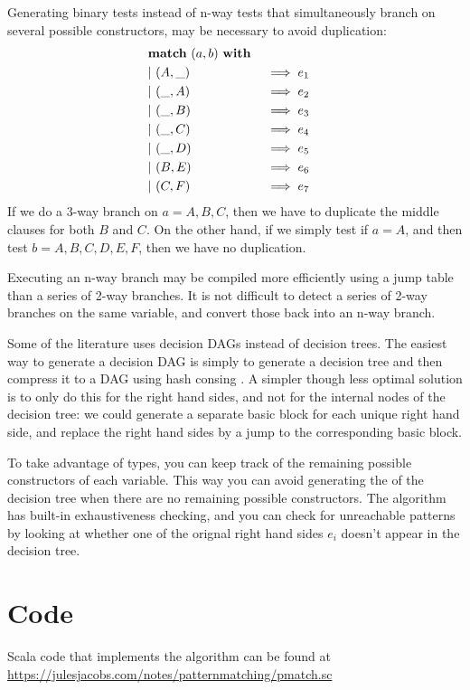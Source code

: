 \documentclass[a4paper, 11pt]{article}
\theoremstyle{definition}
\begin{document}
Generating binary tests instead of n-way tests that simultaneously branch on several possible constructors, may be necessary to avoid duplication:
\begin{alignat*}{4}
  &\mathbf{match}\ (a,b)\ \mathbf{with} \\
  &\mathbf{\mid}\ (A,\_)\quad &&\implies e_1 & \\
  &\mathbf{\mid}\ (\_,A)\quad &&\implies e_2 & \\
  &\mathbf{\mid}\ (\_,B)\quad &&\implies e_3 & \\
  &\mathbf{\mid}\ (\_,C)\quad &&\implies e_4 & \\
  &\mathbf{\mid}\ (\_,D)\quad &&\implies e_5 & \\
  &\mathbf{\mid}\ (B,E)\quad &&\implies e_6 & \\
  &\mathbf{\mid}\ (C,F)\quad &&\implies e_7 &
\end{alignat*}
If we do a 3-way branch on $a=A,B,C$, then we have to duplicate the middle clauses for both $B$ and $C$. On the other hand, if we simply test if $a=A$, and then test $b=A,B,C,D,E,F$, then we have no duplication.

Executing an n-way branch may be compiled more efficiently using a jump table than a series of 2-way branches. It is not difficult to detect a series of 2-way branches on the same variable, and convert those back into an n-way branch.

Some of the literature uses decision DAGs instead of decision trees. The easiest way to generate a decision DAG is simply to generate a decision tree and then compress it to a DAG using hash consing \cite{maranget_compiling_2008}. A simpler though less optimal solution is to only do this for the right hand sides, and not for the internal nodes of the decision tree: we could generate a separate basic block for each unique right hand side, and replace the right hand sides by a jump to the corresponding basic block.

To take advantage of types, you can keep track of the remaining possible constructors of each variable. This way you can avoid generating the of the decision tree when there are no remaining possible constructors. The algorithm has built-in exhaustiveness checking, and you can check for unreachable patterns by looking at whether one of the orignal right hand sides $e_i$ doesn't appear in the decision tree.

\section{Code}

Scala code that implements the algorithm can be found at \\ \url{https://julesjacobs.com/notes/patternmatching/pmatch.sc}

\nocite{*}


\end{document}
